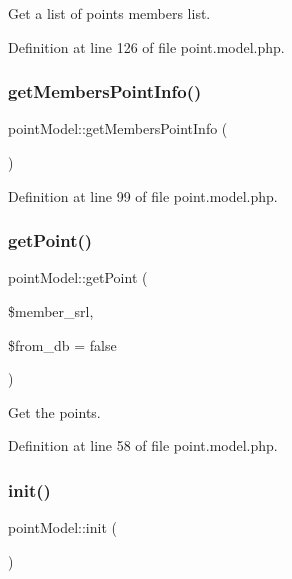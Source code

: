 Get a list of points members list. 



Definition at line 126 of file point.\+model.\+php.

\hypertarget{classpointModel_a87117e204a484410442a54ee56332836}{}\label{classpointModel_a87117e204a484410442a54ee56332836} 
\subsubsection{\texorpdfstring{get\+Members\+Point\+Info()}{getMembersPointInfo()}}
{\footnotesize\ttfamily point\+Model\+::get\+Members\+Point\+Info (\begin{DoxyParamCaption}{ }\end{DoxyParamCaption})}



Definition at line 99 of file point.\+model.\+php.

\hypertarget{classpointModel_ac3d92531cca94dd31fde8f6b86a855fc}{}\label{classpointModel_ac3d92531cca94dd31fde8f6b86a855fc} 
\subsubsection{\texorpdfstring{get\+Point()}{getPoint()}}
{\footnotesize\ttfamily point\+Model\+::get\+Point (\begin{DoxyParamCaption}\item[{}]{\$member\+\_\+srl,  }\item[{}]{\$from\+\_\+db = {\ttfamily false} }\end{DoxyParamCaption})}



Get the points. 



Definition at line 58 of file point.\+model.\+php.

\hypertarget{classpointModel_add66679251115fa4592f15398f3efc62}{}\label{classpointModel_add66679251115fa4592f15398f3efc62} 
\subsubsection{\texorpdfstring{init()}{init()}}
{\footnotesize\ttfamily point\+Model\+::init (\begin{DoxyParamCaption}{ }\end{DoxyParamCaption})}



